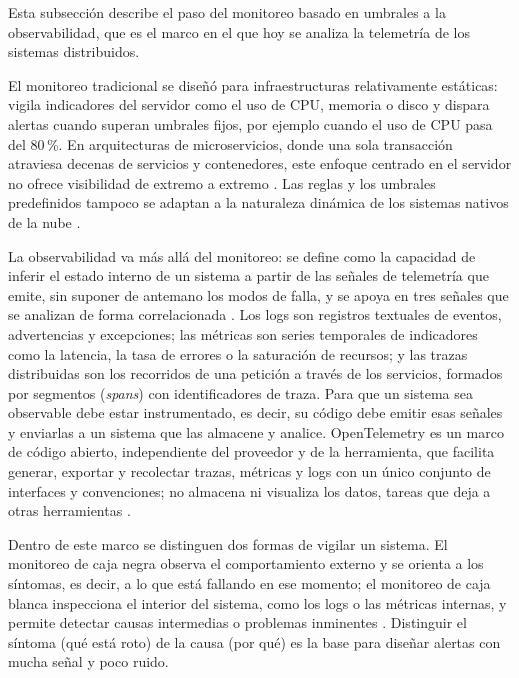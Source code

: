Esta subsección describe el paso del monitoreo basado en umbrales a la observabilidad, que es el marco en el que hoy se analiza la telemetría de los sistemas distribuidos.

El monitoreo tradicional se diseñó para infraestructuras relativamente estáticas: vigila indicadores del servidor como el uso de CPU, memoria o disco y dispara alertas cuando superan umbrales fijos, por ejemplo cuando el uso de CPU pasa del 80\,\%. En arquitecturas de microservicios, donde una sola transacción atraviesa decenas de servicios y contenedores, este enfoque centrado en el servidor no ofrece visibilidad de extremo a extremo \cite{nellutla2026_observability}. Las reglas y los umbrales predefinidos tampoco se adaptan a la naturaleza dinámica de los sistemas nativos de la nube \cite{wang2025_cloudnative_rca}.

La observabilidad va más allá del monitoreo: se define como la capacidad de inferir el estado interno de un sistema a partir de las señales de telemetría que emite, sin suponer de antemano los modos de falla, y se apoya en tres señales que se analizan de forma correlacionada \cite{nellutla2026_observability}. Los logs son registros textuales de eventos, advertencias y excepciones; las métricas son series temporales de indicadores como la latencia, la tasa de errores o la saturación de recursos; y las trazas distribuidas son los recorridos de una petición a través de los servicios, formados por segmentos (\textit{spans}) con identificadores de traza. Para que un sistema sea observable debe estar instrumentado, es decir, su código debe emitir esas señales y enviarlas a un sistema que las almacene y analice. OpenTelemetry es un marco de código abierto, independiente del proveedor y de la herramienta, que facilita generar, exportar y recolectar trazas, métricas y logs con un único conjunto de interfaces y convenciones; no almacena ni visualiza los datos, tareas que deja a otras herramientas \cite{opentelemetry_docs}.

Dentro de este marco se distinguen dos formas de vigilar un sistema. El monitoreo de caja negra observa el comportamiento externo y se orienta a los síntomas, es decir, a lo que está fallando en ese momento; el monitoreo de caja blanca inspecciona el interior del sistema, como los logs o las métricas internas, y permite detectar causas intermedias o problemas inminentes \cite{ewaschuk2016_sre_monitoring}. Distinguir el síntoma (qué está roto) de la causa (por qué) es la base para diseñar alertas con mucha señal y poco ruido.

